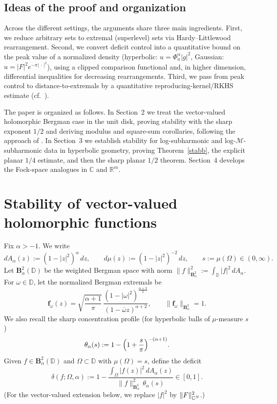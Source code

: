 \documentclass[a4paper,10pt]{amsart}
\newcommand{\D}{\mathbb{D}}
\newcommand{\Berg}{\mathbf{B}_{\alpha}^2}
\begin{document}
\subsection{Ideas of the proof and organization}

Across the different settings, the arguments share three main ingredients.
First, we reduce arbitrary sets to extremal (superlevel) sets via Hardy--Littlewood rearrangement.
Second, we convert deficit control into a quantitative bound on the peak value of a normalized
density (hyperbolic: $u=\Phi_n^\alpha|g|^2$, Gaussian: $u=|F|^2e^{-\pi|\,\cdot\,|^2}$), using a
clipped comparison functional and, in higher dimension, differential inequalities for decreasing
rearrangements. Third, we pass from peak control to distance-to-extremals by a quantitative
reproducing-kernel/RKHS estimate (cf.\ \cite{kulikov2022}).

The paper is organized as follows. In Section~2 we treat the vector-valued holomorphic Bergman case
in the unit disk, proving stability with the sharp exponent $1/2$ and deriving modulus and
square-sum corollaries, following the approach of \cite{GomezKalajMelentijevicRamos2025}.
In Section~3 we establish stability for log-subharmonic and log-$\mathcal M$-subharmonic data in
hyperbolic geometry, proving Theorem~\ref{stabb}, the explicit planar $1/4$
estimate, and then the sharp planar $1/2$ theorem. Section~4 develops the
Fock-space analogues in $\mathbb C$ and $\mathbb R^m$.

\section{Stability of vector-valued holomorphic functions}

Fix $\alpha>-1$. We write
\[
dA_\alpha(z):=(1-|z|^2)^\alpha\,dz,
\qquad
d\mu(z):=(1-|z|^2)^{-2}\,dz,
\qquad
s:=\mu(\Omega)\in(0,\infty).
\]
Let $\mathbf B_\alpha^2(\D)$ be the weighted Bergman space with norm
$\|f\|_{\Berg}^2:=\int_\D |f|^2\,dA_\alpha$.
For $\omega\in\D$, let the normalized Bergman extremals be
\[
\mathbf f_{\omega}(z)
=
\sqrt{\frac{\alpha+1}{\pi}}\,
\frac{(1-|\omega|^2)^{\frac{\alpha+2}{2}}}{(1-\overline{\omega}z)^{\alpha+2}},
\qquad \|\mathbf f_\omega\|_{\Berg}=1.
\]
We also recall the sharp concentration profile (for hyperbolic balls of $\mu$-measure $s$)
\[
\theta_\alpha(s):=1-\Bigl(1+\frac{s}{\pi}\Bigr)^{-(\alpha+1)}.
\]
Given $f\in\mathbf B_\alpha^2(\D)$ and $\Omega\subset\D$ with $\mu(\Omega)=s$, define the deficit
\begin{equation}\label{eq:deficit-scalar}
\delta(f;\Omega,\alpha)
:=
1-\frac{\int_\Omega |f(z)|^2\,dA_\alpha(z)}{\|f\|_{\Berg}^2\,\theta_\alpha(s)}
\in[0,1].
\end{equation}
(For the vector-valued extension below, we replace $|f|^2$ by $\|F\|_{\mathbb{C}^N}^2$.)
\end{document}
